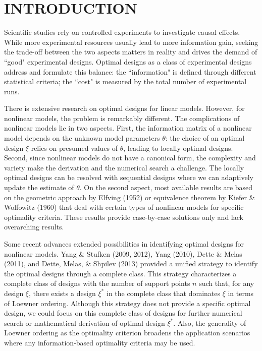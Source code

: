 \documentclass[12pt]{TD-CJS}
\begin{document}

\section{INTRODUCTION}
Scientific studies rely on controlled experiments to investigate causal effects. While more experimental resources usually lead to more information gain, seeking the trade-off between the two aspects matters in reality and drives the demand of ``good" experimental designs. Optimal designs as a class of experimental designs address and formulate this balance: the ``information" is defined through different statistical criteria; the ``cost" is measured by the total number of experimental runs. 






There is extensive research on optimal designs for linear models. However, for nonlinear models, the problem is remarkably different. The complications of nonlinear models lie in two aspects. First, the information matrix of a nonlinear model depends on the unknown model parameters $\theta$: the choice of an optimal design $\xi$ relies on presumed values of $\theta$, leading to locally optimal designs. 
Second, since nonlinear models do not have a canonical form, the complexity and variety make the derivation and the numerical search a challenge. The locally optimal designs can be resolved with sequential designs where we can adaptively update the estimate of $\theta$.
On the second aspect, most available results are based on the geometric approach by Elfving (1952) or equivalence theorem by Kiefer \& Wolfowitz (1960) that deal with certain types of nonlinear models for specific optimality criteria. These results provide case-by-case solutions only and lack overarching results.




Some recent advances extended possibilities in identifying optimal designs for nonlinear models. Yang \& Stufken (2009, 2012), Yang (2010), Dette \& Melas (2011), and Dette, Melas, \& Shpilev (2013) provided a unified strategy to identify the optimal designs through a complete class. This strategy characterizes a complete class of designs with the number of support points $n$ such that, for any design $\xi$, there exists a design $\xi^*$ in the complete class that dominates $\xi$ in terms of Loewner ordering. Although this strategy does not provide a specific optimal design, we could focus on this complete class of designs for further numerical search or mathematical derivation of optimal design $\xi^*$. Also, the generality of Loewner ordering as the optimality criterion broadens the application scenarios where any information-based optimality criteria may be used.
\end{document}
